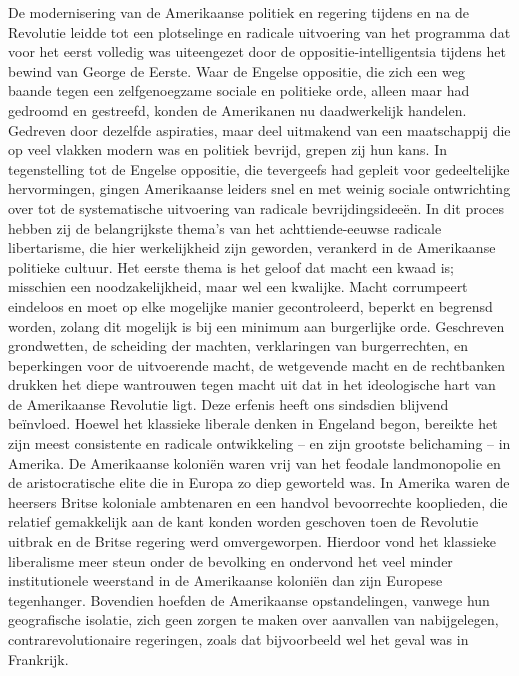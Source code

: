 \documentclass[
  a5paper,
  smalldemyvopaper,10pt,twoside,onecolumn,openright,extrafontsizes,hidelinks]{memoir}
\begin{document}
De modernisering van de Amerikaanse politiek en regering tijdens en na
de Revolutie leidde tot een plotselinge en radicale uitvoering van het
programma dat voor het eerst volledig was uiteengezet door de
oppositie-intelligentsia tijdens het bewind van George de Eerste. Waar
de Engelse oppositie, die zich een weg baande tegen een zelfgenoegzame
sociale en politieke orde, alleen maar had gedroomd en gestreefd, konden
de Amerikanen nu daadwerkelijk handelen. Gedreven door dezelfde
aspiraties, maar deel uitmakend van een maatschappij die op veel vlakken
modern was en politiek bevrijd, grepen zij hun kans. In tegenstelling
tot de Engelse oppositie, die tevergeefs had gepleit voor gedeeltelijke
hervormingen, gingen Amerikaanse leiders snel en met weinig sociale
ontwrichting over tot de systematische uitvoering van radicale
bevrijdingsideeën. In dit proces hebben zij de belangrijkste thema's van
het achttiende-eeuwse radicale libertarisme, die hier werkelijkheid zijn
geworden, verankerd in de Amerikaanse politieke cultuur. Het eerste
thema is het geloof dat macht een kwaad is; misschien een
noodzakelijkheid, maar wel een kwalijke. Macht corrumpeert eindeloos en
moet op elke mogelijke manier gecontroleerd, beperkt en begrensd worden,
zolang dit mogelijk is bij een minimum aan burgerlijke orde. Geschreven
grondwetten, de scheiding der machten, verklaringen van burgerrechten,
en beperkingen voor de uitvoerende macht, de wetgevende macht en de
rechtbanken drukken het diepe wantrouwen tegen macht uit dat in het
ideologische hart van de Amerikaanse Revolutie ligt. Deze erfenis heeft
ons sindsdien blijvend beïnvloed. Hoewel het klassieke liberale denken
in Engeland begon, bereikte het zijn meest consistente en radicale
ontwikkeling -- en zijn grootste belichaming -- in Amerika. De
Amerikaanse koloniën waren vrij van het feodale landmonopolie en de
aristocratische elite die in Europa zo diep geworteld was. In Amerika
waren de heersers Britse koloniale ambtenaren en een handvol
bevoorrechte kooplieden, die relatief gemakkelijk aan de kant konden
worden geschoven toen de Revolutie uitbrak en de Britse regering werd
omvergeworpen. Hierdoor vond het klassieke liberalisme meer steun onder
de bevolking en ondervond het veel minder institutionele weerstand in de
Amerikaanse koloniën dan zijn Europese tegenhanger. Bovendien hoefden de
Amerikaanse opstandelingen, vanwege hun geografische isolatie, zich geen
zorgen te maken over aanvallen van nabijgelegen, contrarevolutionaire
regeringen, zoals dat bijvoorbeeld wel het geval was in Frankrijk.
\end{document}
